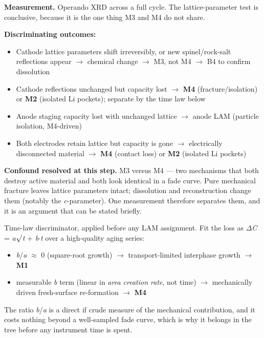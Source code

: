 \documentclass[11pt,a4paper]{article}
\begin{document}
\textbf{Measurement.} Operando XRD across a full cycle. The lattice-parameter test is conclusive, because it is the one thing M3 and M4 do not share.


\textbf{Discriminating outcomes:}


\begin{itemize}
  \item Cathode lattice parameters shift irreversibly, or new spinel/rock-salt reflections appear \ensuremath{\rightarrow} chemical change \ensuremath{\rightarrow} M3, not M4 \ensuremath{\rightarrow} B4 to confirm dissolution
  \item Cathode reflections unchanged but capacity lost \ensuremath{\rightarrow} \textbf{M4} (fracture/isolation) or \textbf{M2} (isolated Li pockets); separate by the time law below
  \item Anode staging capacity lost with unchanged lattice \ensuremath{\rightarrow} anode LAM (particle isolation, M4-driven)
  \item Both electrodes retain lattice but capacity is gone \ensuremath{\rightarrow} electrically disconnected material \ensuremath{\rightarrow} \textbf{M4} (contact loss) or \textbf{M2} (isolated Li pockets)
\end{itemize}


\textbf{Confound resolved at this step.} M3 versus M4 --- two mechanisms that both destroy active material and both look identical in a fade curve. Pure mechanical fracture leaves lattice parameters intact; dissolution and reconstruction change them (notably the \emph{c}-parameter). One measurement therefore separates them, and it is an argument that can be stated briefly.


Time-law discriminator, applied before any LAM assignment. Fit the loss as \ensuremath{\Delta}\emph{C} = \emph{a}\ensuremath{\surd}\emph{t} + \emph{b}\ensuremath{\cdot}\emph{t} over a high-quality aging series:


\begin{itemize}
  \item \emph{b}/\emph{a} \ensuremath{\approx} 0 (square-root growth) \ensuremath{\rightarrow} transport-limited interphase growth \ensuremath{\rightarrow} \textbf{M1}
  \item measurable \emph{b} term (linear in \emph{area creation rate}, not time) \ensuremath{\rightarrow} mechanically driven fresh-surface re-formation \ensuremath{\rightarrow} \textbf{M4}
\end{itemize}


The ratio \emph{b}/\emph{a} is a direct if crude measure of the mechanical contribution, and it costs nothing beyond a well-sampled fade curve, which is why it belongs in the tree before any instrument time is spent.
\end{document}
